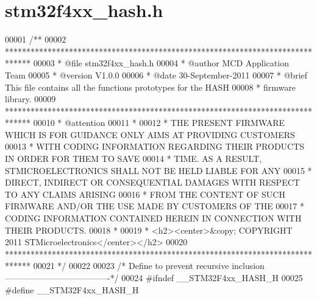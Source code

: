 \section{stm32f4xx\+\_\+hash.\+h}
\label{stm32f4xx__hash_8h_source}

\begin{DoxyCode}
00001 \textcolor{comment}{/**}
00002 \textcolor{comment}{  ******************************************************************************}
00003 \textcolor{comment}{  * @file    stm32f4xx\_hash.h}
00004 \textcolor{comment}{  * @author  MCD Application Team}
00005 \textcolor{comment}{  * @version V1.0.0}
00006 \textcolor{comment}{  * @date    30-September-2011}
00007 \textcolor{comment}{  * @brief   This file contains all the functions prototypes for the HASH }
00008 \textcolor{comment}{  *          firmware library.}
00009 \textcolor{comment}{  ******************************************************************************}
00010 \textcolor{comment}{  * @attention}
00011 \textcolor{comment}{  *}
00012 \textcolor{comment}{  * THE PRESENT FIRMWARE WHICH IS FOR GUIDANCE ONLY AIMS AT PROVIDING CUSTOMERS}
00013 \textcolor{comment}{  * WITH CODING INFORMATION REGARDING THEIR PRODUCTS IN ORDER FOR THEM TO SAVE}
00014 \textcolor{comment}{  * TIME. AS A RESULT, STMICROELECTRONICS SHALL NOT BE HELD LIABLE FOR ANY}
00015 \textcolor{comment}{  * DIRECT, INDIRECT OR CONSEQUENTIAL DAMAGES WITH RESPECT TO ANY CLAIMS ARISING}
00016 \textcolor{comment}{  * FROM THE CONTENT OF SUCH FIRMWARE AND/OR THE USE MADE BY CUSTOMERS OF THE}
00017 \textcolor{comment}{  * CODING INFORMATION CONTAINED HEREIN IN CONNECTION WITH THEIR PRODUCTS.}
00018 \textcolor{comment}{  *}
00019 \textcolor{comment}{  * <h2><center>&copy; COPYRIGHT 2011 STMicroelectronics</center></h2>}
00020 \textcolor{comment}{  ******************************************************************************}
00021 \textcolor{comment}{  */}
00022 
00023 \textcolor{comment}{/* Define to prevent recursive inclusion -------------------------------------*/}
00024 \textcolor{preprocessor}{#}\textcolor{preprocessor}{ifndef} \textcolor{preprocessor}{\_\_STM32F4xx\_HASH\_H}
00025 \textcolor{preprocessor}{#}\textcolor{preprocessor}{define} \textcolor{preprocessor}{\_\_STM32F4xx\_HASH\_H}

\end{DoxyCode}
